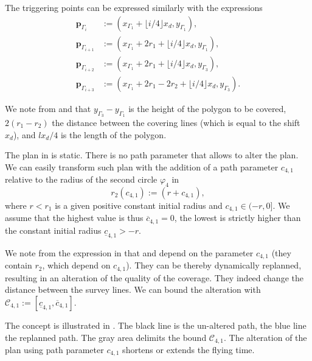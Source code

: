 The triggering points can be expressed similarly with the expressions
\begin{subequations}\label{eq:trigs-gene}\begin{align}
  \mathbf{p}_{\Gamma_i}&:=(x_{\Gamma_1}+\lfloor i/4\rfloor x_d,y_{\Gamma_1}),\\
  \mathbf{p}_{\Gamma_{i+1}}&:=(x_{\Gamma_1}+2r_1+\lfloor i/4\rfloor x_d,y_{\Gamma_1}),\\
  \mathbf{p}_{\Gamma_{i+2}}&:=(x_{\Gamma_1}+2r_1+\lfloor i/4\rfloor x_d,y_{\Gamma_3}),\\
  \mathbf{p}_{\Gamma_{i+3}}&:=(x_{\Gamma_1}+2r_1-2r_2+\lfloor i/4\rfloor x_d,y_{\Gamma_3})\label{eq:last-trig-gene}.
\end{align}
\end{subequations}

We note from  and  that $y_{\Gamma_3}-y_{\Gamma_1}$ is the height of the polygon to be covered, $2(r_1-r_2)$ the distance between the covering lines (which is equal to the shift $x_d$), and $lx_d/4$ is the length of the polygon.

The plan in  is static. There is no path parameter that allows to alter the plan. We can easily transform such plan with the addition of a path parameter $c_{4,1}$ relative to the radius of the second circle $\varphi_4$ in 
\begin{equation}\label{eq:radius-dynamic}
  r_2(c_{4,1}):=(r+c_{4,1}),
\end{equation}
where $r<r_1$ is a given positive constant initial radius and $c_{4,1}\in(-r,0]$. We assume that the highest value is thus $\overline{c}_{4,1}=0$, the lowest is strictly higher than the constant initial radius $\underline{c}_{4,1}>-r$.

We note from the expression in  that  and  depend on the parameter $c_{4,1}$ (they contain $r_2$, which depend on $c_{4,1}$). They can be thereby dynamically replanned, resulting in an alteration of the quality of the coverage. They indeed change the distance between the survey lines.
We can bound the alteration with $\mathcal{C}_{4,1}:=[\underline{c}_{4,1},\overline{c}_{4,1}]$. 

The concept is illustrated in . The black line is the un-altered path, the blue line the replanned path. The gray area delimits the bound $\mathcal{C}_{4,1}$. The alteration of the plan using path parameter $c_{4,1}$ shortens or extends the flying time.

